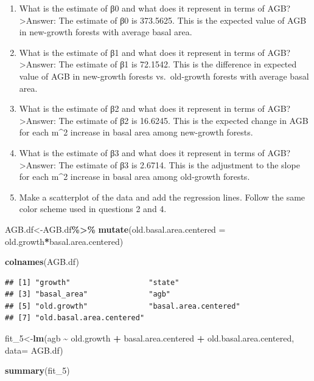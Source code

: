 \documentclass[
]{article}
\newenvironment{Shaded}{\begin{snugshade}}{\end{snugshade}}
\newcommand{\AttributeTok}[1]{\textcolor[rgb]{0.13,0.29,0.53}{#1}}
\newcommand{\FunctionTok}[1]{\textcolor[rgb]{0.13,0.29,0.53}{\textbf{#1}}}
\newcommand{\NormalTok}[1]{#1}
\newcommand{\OtherTok}[1]{\textcolor[rgb]{0.56,0.35,0.01}{#1}}
\newcommand{\SpecialCharTok}[1]{\textcolor[rgb]{0.81,0.36,0.00}{\textbf{#1}}}
\begin{document}
\begin{enumerate}
\def\labelenumi{\alph{enumi}.}
\item
  What is the estimate of β0 and what does it represent in terms of AGB?
  \textgreater Answer: The estimate of β0 is 373.5625. This is the
  expected value of AGB in new-growth forests with average basal area.
\item
  What is the estimate of β1 and what does it represent in terms of AGB?
  \textgreater Answer: The estimate of β1 is 72.1542. This is the
  difference in expected value of AGB in new-growth forests
  vs.~old-growth forests with average basal area.
\item
  What is the estimate of β2 and what does it represent in terms of AGB?
  \textgreater Answer: The estimate of β2 is 16.6245. This is the
  expected change in AGB for each m\^{}2 increase in basal area among
  new-growth forests.
\item
  What is the estimate of β3 and what does it represent in terms of AGB?
  \textgreater Answer: The estimate of β3 is 2.6714. This is the
  adjustment to the slope for each m\^{}2 increase in basal area among
  old-growth forests.
\item
  Make a scatterplot of the data and add the regression lines. Follow
  the same color scheme used in questions 2 and 4.
\end{enumerate}

\begin{Shaded}
\begin{Highlighting}[]
\NormalTok{AGB.df}\OtherTok{\textless{}{-}}\NormalTok{AGB.df}\SpecialCharTok{\%\textgreater{}\%}
  \FunctionTok{mutate}\NormalTok{(}\AttributeTok{old.basal.area.centered =}\NormalTok{ old.growth}\SpecialCharTok{*}\NormalTok{basal.area.centered)}

\FunctionTok{colnames}\NormalTok{(AGB.df)}
\end{Highlighting}
\end{Shaded}

\begin{verbatim}
## [1] "growth"                  "state"                  
## [3] "basal_area"              "agb"                    
## [5] "old.growth"              "basal.area.centered"    
## [7] "old.basal.area.centered"
\end{verbatim}

\begin{Shaded}
\begin{Highlighting}[]
\NormalTok{fit\_5}\OtherTok{\textless{}{-}}\FunctionTok{lm}\NormalTok{(agb }\SpecialCharTok{\textasciitilde{}}\NormalTok{ old.growth }\SpecialCharTok{+}\NormalTok{ basal.area.centered }\SpecialCharTok{+}\NormalTok{ old.basal.area.centered, }\AttributeTok{data=}\NormalTok{ AGB.df)}

\FunctionTok{summary}\NormalTok{(fit\_5)}
\end{Highlighting}
\end{Shaded}
\end{document}
